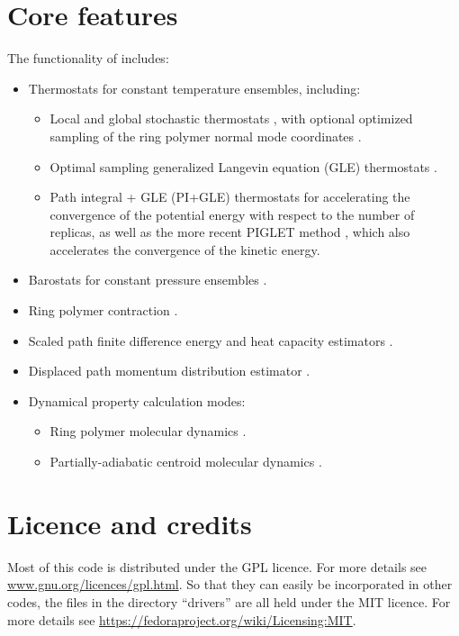 \documentclass[11pt,english,fleqn]{report}
\begin{document}
\section{Core features}

The functionality of \ipi includes:
\begin{itemize}
\item Thermostats for constant temperature ensembles, including: \begin{itemize}
\item Local and global stochastic thermostats \cite{plangevin1908cras,buss-parr08cpc}, with optional optimized sampling of the ring polymer normal mode coordinates \cite{ceri+10jcp}.
\item Optimal sampling generalized Langevin equation (GLE) thermostats \cite{ceri+09jctc}.
\item Path integral + GLE (PI+GLE) thermostats \cite{ceri+11jcp} for accelerating the
convergence of the potential energy with respect to the number of replicas, 
as well as the more recent PIGLET method \cite{ceri-mano12prl}, which also
accelerates the convergence of the kinetic energy.
\end{itemize}
\item Barostats for constant pressure ensembles \cite{mart+99jcp,buss+09jpc}.
\item Ring polymer contraction \cite{mark-mano08jcp}.
\item Scaled path finite difference energy and heat capacity estimators
\cite{tyamamoto05jcp}.
\item Displaced path momentum distribution estimator \cite{linlin+10prl}.
\item Dynamical property calculation modes:\begin{itemize}
\item Ring polymer molecular dynamics \cite{crai-mano04jcp}.
\item Partially-adiabatic centroid molecular dynamics \cite{habe+08jcp,hone+06jcp}.
\end{itemize}
\end{itemize}

\section{Licence and credits}

Most of this code is distributed under the GPL licence. For more details see
\url{www.gnu.org/licences/gpl.html}. 
So that they can easily be incorporated in other codes, the files
in the directory {}``drivers'' are all held under the MIT licence.
For more details see \url{https://fedoraproject.org/wiki/Licensing:MIT}.
\end{document}
